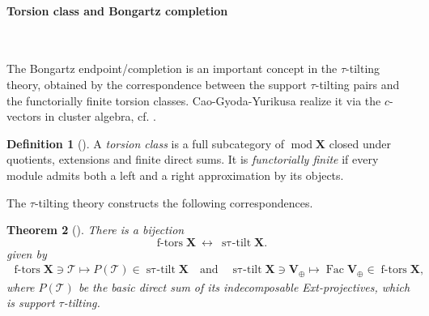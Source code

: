 \documentclass[11pt,reqno]{amsart}
\theoremstyle{plain}
\newtheorem{theorem}{Theorem}[section]
\theoremstyle{definition}
\newtheorem{definition}[theorem]{Definition}
\numberwithin{equation}{section}
\newcommand\hua{\mathcal}
\newcommand\<{\langle}
\renewcommand\>{\rangle}
\newcommand\Grot{\operatorname{K}} %
\newcommand{\per}{\operatorname{per}} %
\newcommand{\on}[1]{\operatorname{#1}}
\newcommand{\pcts}[1]{\mathbf{#1}}%
\newcommand{\pcto}[1]{\mathbf{#1}_\oplus} %
\newcommand{\bfit}[1]{\textbf{\textit{#1}}}
\def\gvec{\bfit{g}}
\begin{document}


\paragraph{\textbf{Torsion class and Bongartz completion}}\

The Bongartz endpoint/completion is an important concept in the $\tau$-tilting theory, obtained by the correspondence between the support $\tau$-tilting pairs and the functorially finite torsion classes.
Cao-Gyoda-Yurikusa realize it via the $c$-vectors in cluster algebra, cf. \cite{CGY}.  

\begin{definition}[{\cite[\S2]{AIR}}]
A \emph{torsion class} is a full subcategory of $\on{mod}\pcts{X}$ closed under quotients, extensions and finite direct sums. 
It is \emph{functorially finite} if every module admits both a left and a right approximation by its objects.
\end{definition}

The $\tau$-tilting theory constructs the following correspondences.

\begin{theorem}[{\cite[Thms.~2.7]{AIR}}]
\label{thm:app-tau-dictionary2}
There is a bijection
\[
 \on{f-tors}\pcts{X}\ \longleftrightarrow\
 \on{s\tau-tilt}\pcts{X}.
\]
given by
\begin{gather}
    \on{f-tors}\pcts{X}\ni\hua{T}\mapsto P(\hua{T})\in\on{s\tau-tilt}\pcts{X}
    \quad\text{and}\quad
    \on{s\tau-tilt}\pcts{X}\ni \pcto{V}\mapsto \on{Fac}\pcto{V}\in\on{f-tors}\pcts{X},
\end{gather}
where $P(\mathcal T)$ be the basic direct sum of its indecomposable Ext-projectives, which is support $\tau$-tilting.
\end{theorem}
\end{document}
